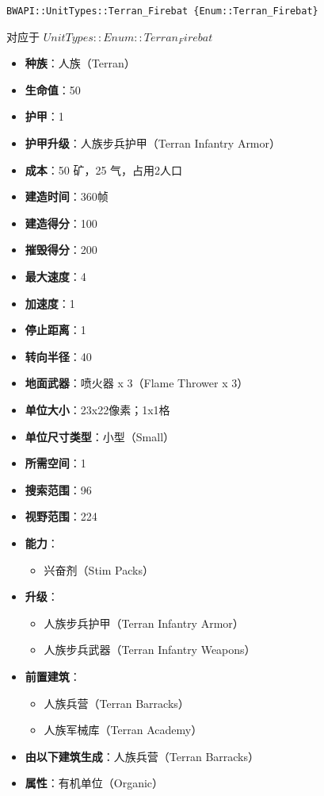 \begin{tcolorbox}[colback=white, colframe=black!60!white, title=Terran\_Firebat(), arc=0mm]
\begin{verbatim}
BWAPI::UnitTypes::Terran_Firebat {Enum::Terran_Firebat}
\end{verbatim}
对应于  $UnitTypes::Enum::Terran_Firebat$ 
\begin{itemize}
    \item \textbf{种族}：人族（Terran）
    \item \textbf{生命值}：50
    \item \textbf{护甲}：1
    \item \textbf{护甲升级}：人族步兵护甲（Terran Infantry Armor）
    \item \textbf{成本}：50 矿，25 气，占用2人口
    \item \textbf{建造时间}：360帧
    \item \textbf{建造得分}：100
    \item \textbf{摧毁得分}：200
    \item \textbf{最大速度}：4
    \item \textbf{加速度}：1
    \item \textbf{停止距离}：1
    \item \textbf{转向半径}：40
    \item \textbf{地面武器}：喷火器 x 3（Flame Thrower x 3）
    \item \textbf{单位大小}：23x22像素；1x1格
    \item \textbf{单位尺寸类型}：小型（Small）
    \item \textbf{所需空间}：1
    \item \textbf{搜索范围}：96
    \item \textbf{视野范围}：224
    \item \textbf{能力}：
        \begin{itemize}
            \item 兴奋剂（Stim Packs）
        \end{itemize}
    \item \textbf{升级}：
        \begin{itemize}
            \item 人族步兵护甲（Terran Infantry Armor）
            \item 人族步兵武器（Terran Infantry Weapons）
        \end{itemize}
    \item \textbf{前置建筑}：
        \begin{itemize}
            \item 人族兵营（Terran Barracks）
            \item 人族军械库（Terran Academy）
        \end{itemize}
    \item \textbf{由以下建筑生成}：人族兵营（Terran Barracks）
    \item \textbf{属性}：有机单位（Organic）
\end{itemize}
\end{tcolorbox}

